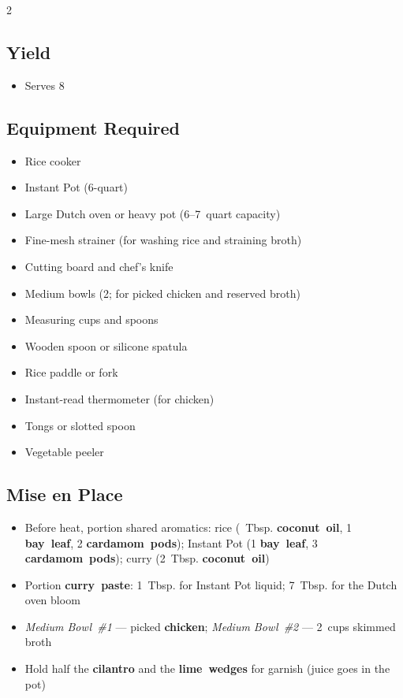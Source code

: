 \documentclass[11pt,letterpaper]{article}
\begin{document}
\newpage

{\footnotesize
\setlength{\columnsep}{20pt}
\setlength{\multicolsep}{6pt}
\begin{multicols}{2}
\setlength{\parindent}{0pt}
\setlength{\parskip}{2pt}
\setlength{\itemsep}{0pt}
\setlength{\parsep}{0pt}

\subsection*{Yield}
\begin{itemize}
    \item Serves 8
\end{itemize}

\subsection*{Equipment Required}
\begin{itemize}
    \item Rice cooker
    \item Instant Pot (6-quart)
    \item Large Dutch oven or heavy pot (6--7~quart capacity)
    \item Fine-mesh strainer (for washing rice and straining broth)
    \item Cutting board and chef's knife
    \item Medium bowls (2; for picked chicken and reserved broth)
    \item Measuring cups and spoons
    \item Wooden spoon or silicone spatula
    \item Rice paddle or fork
    \item Instant-read thermometer (for chicken)
    \item Tongs or slotted spoon
    \item Vegetable peeler
\end{itemize}

\subsection*{Mise en Place}
\begin{itemize}
    \item Before heat, portion shared aromatics: rice (~Tbsp. \textbf{coconut~oil}, 1 \textbf{bay~leaf}, 2 \textbf{cardamom~pods}); Instant Pot (1 \textbf{bay~leaf}, 3 \textbf{cardamom~pods}); curry (2~Tbsp. \textbf{coconut~oil})
    \item Portion \textbf{curry~paste}: 1~Tbsp. for Instant Pot liquid; 7~Tbsp. for the Dutch oven bloom
    \item \textit{Medium Bowl~\#1} --- picked \textbf{chicken}; \textit{Medium Bowl~\#2} --- 2~cups skimmed broth
    \item Hold half the \textbf{cilantro} and the \textbf{lime~wedges} for garnish (juice goes in the pot)
\end{itemize}


\end{multicols}}
\end{document}
